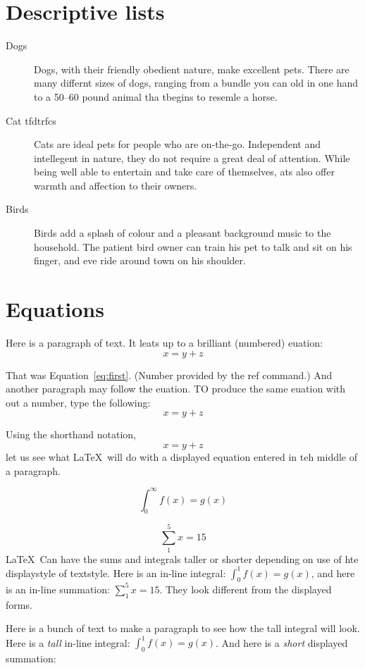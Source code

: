 \documentclass[12pt,twoside,leqno]{article}%
\begin{document}
\section{Descriptive lists}
\begin{description}
\item [Dogs] Dogs, with their friendly obedient nature, make excellent pets. There are many differnt sizes of dogs, ranging from a bundle you can old in one hand to a 50--60 pound animal tha tbegins to resemle a horse. 
\item [Cat tfdtrfcs] Cats are ideal pets for people who are on-the-go. Independent and intellegent in nature, they do not require a great deal of attention. While being well able to entertain and take care of themselves, ats also offer warmth and affection to their owners.
\item [Birds] Birds add a splash of colour and a pleasant background music to the household. The patient bird owner can train his pet to talk and sit on his finger, and eve ride around town on his shoulder.
\end{description}
\section{Equations}
Here is a paragraph of text. It leats up to a brilliant (numbered) euation:
\begin{equation}
x=y+z
\label{eq:first}
\end{equation}

That was Equation~\ref{eq:first}.  (Number provided by the ref command.) And another paragraph may follow the euation. TO produce the same euation with out a number, type the following:
\begin{displaymath}
x=y+z
\end{displaymath}

Using the shorthand notation, \[x=y+z\] let us see what \LaTeX\ will do with a displayed equation entered in teh middle of a paragraph. 

\begin{equation}
\int_{0}^{\infty} f(x)=g(x)
\end{equation}

\[
\sum_{1}^{5}x=15
\]
\LaTeX\ Can have the sums and integrals taller or shorter depending on use of hte displaystyle of textstyle. Here is an in-line integral: $\int_{0}^{1}f(x)=g(x)$, and here is an in-line summation: $\sum_{1}^{5} x =15$. They look different from the displayed forms.

Here is a bunch of text to make a paragraph to see how the tall integral will look. Here is a {\it tall} in-line integral: $\displaystyle \int_{0}^{1}f(x)=g(x)$. And here is a {\it short} displayed summation:
\end{document}
